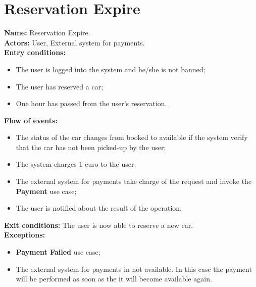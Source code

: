 \section*{Reservation Expire}
\textbf{Name:} Reservation Expire.\\
\textbf{Actors:} User, External system for payments.\\
\textbf{Entry conditions:}
\begin{itemize}
\item The user is logged into the system and he/she is not banned;
\item The user has reserved a car;
\item One hour has passed from the user's reservation.
\end{itemize}
\textbf{Flow of events:}
\begin{itemize}
\item The status of the car changes from booked to available if the system verify that the car has not been picked-up by the user;
\item The system charges 1 euro to the user;
\item The external system for payments take charge of the request and invoke the \textbf{Payment} use case;
\item The user is notified about the result of the operation.
\end{itemize}
\textbf{Exit conditions:} The user is now able to reserve a new car.\\
\textbf{Exceptions:}
\begin{itemize}
\item\textbf{Payment Failed} use case;
\item The external system for payments in not available. In this case the payment will be performed as soon as the it will become available again.
\end{itemize}

